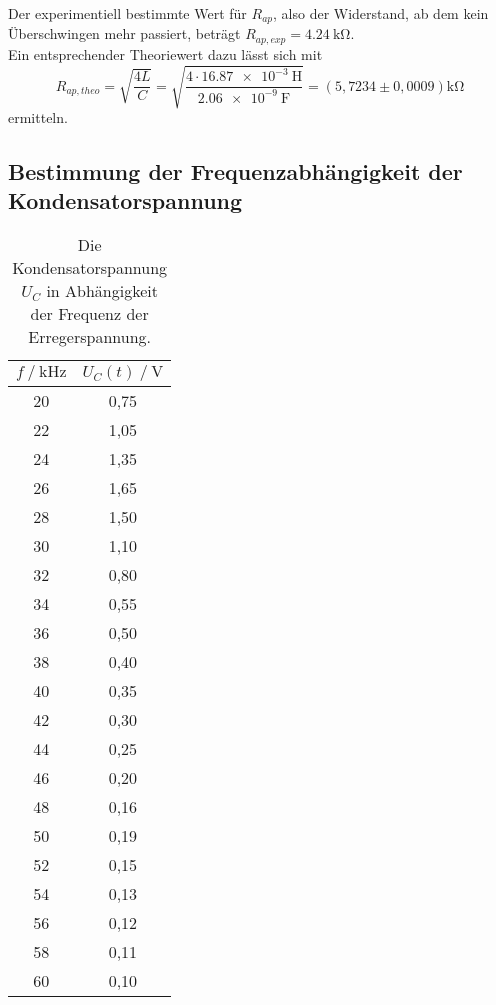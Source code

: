 Der experimentiell bestimmte Wert für $R_{ap}$, also der Widerstand, ab dem kein Überschwingen mehr passiert, beträgt $R_{ap,exp} = \SI{4,24}{\kilo\ohm}$. \\
Ein entsprechender Theoriewert dazu lässt sich mit 
\begin{equation*}
  R_{ap,theo} = \sqrt{\frac{4L}{C}} = \sqrt{\frac{4 \cdot \SI{16,87e-3}{\henry}}{\SI{2,06e-9}{\farad}}} = (5,7234\pm 0,0009)\unit{\kilo\ohm}
\end{equation*}
ermitteln.






\subsection{Bestimmung der Frequenzabhängigkeit der Kondensatorspannung}
\label{Kondensatorspannung}

\begin{table}[H]
  \centering
  \caption{Die Kondensatorspannung $U_C$ in Abhängigkeit der Frequenz der Erregerspannung.}
  \begin{tabular}{cc}
    \toprule
    {$f \mathbin{/} \unit{\kilo\hertz}$} &
    {$U_C(t) \mathbin{/} \unit{\volt}$} \\
    \midrule
    20 & 0,75 \\
    22 & 1,05 \\
    24 & 1,35 \\
    26 & 1,65 \\
    28 & 1,50 \\
    30 & 1,10 \\
    32 & 0,80 \\
    34 & 0,55 \\
    36 & 0,50 \\
    38 & 0,40 \\
    40 & 0,35 \\
    42 & 0,30 \\
    44 & 0,25 \\
    46 & 0,20 \\
    48 & 0,16 \\
    50 & 0,19 \\
    52 & 0,15 \\
    54 & 0,13 \\
    56 & 0,12 \\
    58 & 0,11 \\
    60 & 0,10 \\

    \bottomrule
  \end{tabular}
  \label{tab:Tabelle1}
\end{table}


